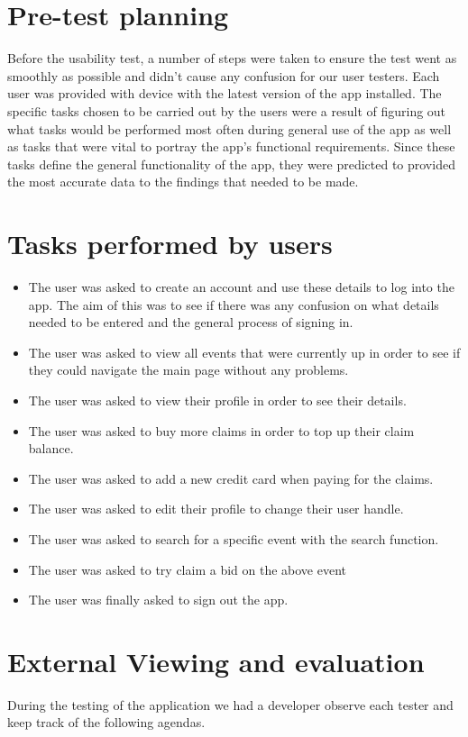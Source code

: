 \documentclass[11pt]{article}
\begin{document}
	\section{Pre-test planning}
	Before the usability test, a number of steps were taken to ensure the test went as smoothly as possible and didn’t cause any confusion for our user testers. Each user was provided with device with the latest version of the app installed.
	\newline
	The specific tasks chosen to be carried out by the users were a result of figuring out what tasks would be performed most often during general use of the app as well as tasks that were vital to portray the app’s functional requirements. Since these tasks define the general functionality of the app, they were predicted to provided the most accurate data to the findings that needed to be made.
	\section{Tasks performed by users}
	\begin{itemize}
		\item The user was asked to create an account and use these details to log into the app. The aim of this was to see if there was any confusion on what details needed to be entered and the general process of signing in.
		\item The user was asked to view all events that were currently up in order to see if they could navigate the main page without any problems.
		\item The user was asked to view their profile in order to see their details.
		\item The user was asked to buy more claims in order to top up their claim balance.
		\item The user was asked to add a new credit card when paying for the claims.
		\item The user was asked to edit their profile to change their user handle.
		\item The user was asked to search for a specific event with the search function.
		\item The user was asked to try claim a bid on the above event
		\item The user was finally asked to sign out the app.
	\end{itemize}
	\section{External Viewing and evaluation}
	During the testing of the application we had a developer observe each tester and keep track of the following agendas.
\end{document}
